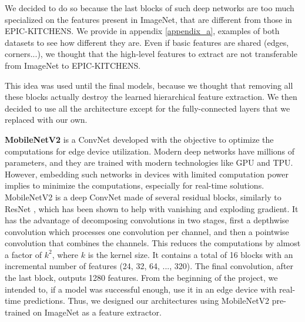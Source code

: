 \documentclass[12pt, a4paper]{report}
\begin{document}
				We decided to do so because the last blocks of such deep networks are too much specialized on the features present in ImageNet, that are different from those in EPIC-KITCHENS.
				We provide in appendix \ref{appendix_a}, examples of both datasets to see how different they are.
				Even if basic features are shared (edges, corners...), we thought that the high-level features to extract are not transferable from ImageNet to EPIC-KITCHENS.
				\par
				This idea was used until the final models, because we thought that removing all these blocks actually destroy the learned hierarchical feature extraction.
				We then decided to use all the architecture except for the fully-connected layers that we replaced with our own.
				\par
				\textbf{MobileNetV2} \cite{sandler2019mobilenetv2} is a ConvNet developed with the objective to optimize the computations for edge device utilization.
				Modern deep networks have millions of parameters, and they are trained with modern technologies like GPU and TPU.
				However, embedding such networks in devices with limited computation power implies to minimize the computations, especially for real-time solutions.
				MobileNetV2 is a deep ConvNet made of several residual blocks, similarly to ResNet \cite{he2015deep}, which has been shown to help with vanishing and exploding gradient.
				It has the advantage of decomposing convolutions in two stages, first a depthwise convolution which processes one convolution per channel, and then a pointwise convolution that combines the channels.
				This reduces the computations by almost a factor of $k^{2}$, where $k$ is the kernel size.
				It contains a total of 16 blocks with an incremental number of features (24, 32, 64, ..., 320).
				The final convolution, after the last block, outputs 1280 features.
				From the beginning of the project, we intended to, if a model was successful enough, use it in an edge device with real-time predictions.
				Thus, we designed our architectures using MobileNetV2 pre-trained on ImageNet as a feature extractor.
\end{document}
